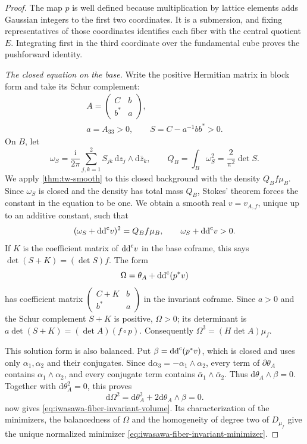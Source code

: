 \begin{proof}
The map $p$ is well defined because multiplication by lattice elements adds Gaussian integers to the first two coordinates. It is a submersion, and fixing representatives of those coordinates identifies each fiber with the central quotient $E$. Integrating first in the third coordinate over the fundamental cube proves the pushforward identity.

\emph{The closed equation on the base.}
Write the positive Hermitian matrix in block form and take its Schur complement:
\[
 \begin{gathered}
 A=\begin{pmatrix}C&b\\ b^*&a\end{pmatrix},\\
 a=A_{33}>0,\qquad S=C-a^{-1}bb^*>0.
 \end{gathered}
\]
On $B$, let
\[
 \omega_S=\frac{\mathrm i}{2\pi}\sum_{j,k=1}^2
       S_{jk}\,\mathrm dz_j\wedge\mathrm d\bar z_k,
 \qquad Q_B=\int_B\omega_S^2=\frac2{\pi^2}\det S.
\]
We apply \cref{thm:tw-smooth} to this closed background with the density $Q_Bf\mu_B$. Since $\omega_S$ is closed and the density has total mass $Q_B$, Stokes' theorem forces the constant in the equation to be one. We obtain a smooth real $v=v_{A,f}$, unique up to an additive constant, such that
\begin{equation}\label{eq:iwasawa-schur-base-equation}
 (\omega_S+\mathrm{dd}^{\mathrm{c}} v)^2=Q_Bf\mu_B,
 \qquad\omega_S+\mathrm{dd}^{\mathrm{c}} v>0.
\end{equation}
If $K$ is the coefficient matrix of $\mathrm{dd}^{\mathrm{c}} v$ in the base coframe, this says $\det(S+K)=(\det S)f$. The form
\[
 \Omega=\theta_A+\mathrm{dd}^{\mathrm{c}}(p^*v)
\]
has coefficient matrix $\left(\begin{smallmatrix}C+K&b\\b^*&a\end{smallmatrix}\right)$ in the invariant coframe. Since $a>0$ and the Schur complement $S+K$ is positive, $\Omega>0$; its determinant is $a\det(S+K)=(\det A)(f\circ p)$. Consequently $\Omega^3=(H\det A)\mu_f$.

This solution form is also balanced. Put $\beta=\mathrm{dd}^{\mathrm{c}}(p^*v)$, which is closed and uses only $\alpha_1,\alpha_2$ and their conjugates. Since $\mathrm d\alpha_3=-\alpha_1\wedge\alpha_2$, every term of $\partial\theta_A$ contains $\alpha_1\wedge\alpha_2$, and every conjugate term contains $\bar\alpha_1\wedge\bar\alpha_2$. Thus $\mathrm d\theta_A\wedge\beta=0$. Together with $\mathrm d\theta_A^2=0$, this proves
\[
 \mathrm d\Omega^2=\mathrm d\theta_A^2+2\mathrm d\theta_A\wedge\beta=0.
\]
 now gives \eqref{eq:iwasawa-fiber-invariant-volume}. Its characterization of the minimizers, the balancedness of $\Omega$ and the homogeneity of degree two of $D_{\mu_f}$ give the unique normalized minimizer \eqref{eq:iwasawa-fiber-invariant-minimizer}.


\end{proof}
